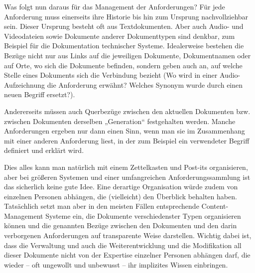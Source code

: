Was folgt nun daraus für das Management der Anforderungen? Für jede Anforderung muss einerseits ihre Historie bis hin zum Ursprung nachvollziehbar sein. Dieser Ursprung besteht oft aus Textdokumenten. Aber auch Audio- und Video\-dateien sowie Dokumente anderer Dokumenttypen sind denkbar, zum Beispiel für die Doku\-mentation technischer Systeme. Idealerweise bestehen die Bezüge nicht nur aus Links auf die jeweiligen Dokumente, Dokumentnamen oder auf Orte, wo sich die Dokumente befinden, sondern geben auch an, auf welche Stelle eines Dokuments sich die Verbindung bezieht (Wo wird in einer Audio-Aufzeichnung die Anforderung erwähnt? Welches Synonym wurde durch einen neuen Begriff ersetzt?). 

\vspace{1mm} %

Andererseits müssen auch Querbezüge zwischen den aktuellen Dokumenten bzw. zwischen Dokumenten derselben „Generation“ festgehalten werden. Manche Anforderungen ergeben nur dann einen Sinn, wenn man sie im Zusammenhang mit einer anderen Anforderung liest, in der zum Beispiel ein verwendeter Begriff definiert und erklärt wird.

\vspace{1mm} %

Dies alles kann man natürlich mit einem Zettelkasten und Post-its organisieren, aber bei größeren Systemen und einer umfangreichen Anforderungssammlung ist das sicherlich keine gute Idee. Eine derartige Organisation würde zudem von einzelnen Personen abhängen, die (vielleicht) den Überblick behalten haben. Tatsächlich setzt man aber in den meisten Fällen entsprechende Content-Management Systeme ein, die Dokumente verschiedenster Typen organisieren können und die genannten Bezüge zwischen den Dokumenten und den darin verborgenen Anforderungen auf transparente Weise darstellen. Wichtig dabei ist, dass die Verwaltung und auch die Weiterentwicklung und die Modifikation all dieser Dokumente nicht von der Expertise einzelner Personen abhängen darf, die wieder – oft ungewollt und unbewusst – ihr implizites Wissen einbringen.

\vspace{1mm} %

